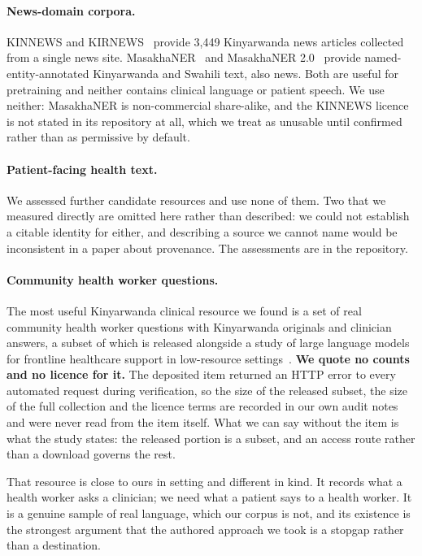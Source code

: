 \paragraph{News-domain corpora.} KINNEWS and KIRNEWS~\cite{niyongabo2020kinnews} provide 3{,}449 Kinyarwanda
news articles collected from a single news site. MasakhaNER~\cite{adelani2021masakhaner}
and MasakhaNER 2.0~\cite{adelani2022masakhaner2} provide named-entity-annotated
Kinyarwanda and Swahili text, also news. Both are useful
for pretraining and neither contains clinical language or patient speech. We use
neither: MasakhaNER is non-commercial share-alike, and the KINNEWS licence is not
stated in its repository at all, which we treat as unusable until confirmed
rather than as permissive by default.

\paragraph{Patient-facing health text.} We assessed further candidate resources
and use none of them. Two that we measured directly are omitted here rather than
described: we could not establish a citable identity for either, and describing a
source we cannot name would be inconsistent in a paper about provenance. The
assessments are in the repository.

\paragraph{Community health worker questions.} The most useful Kinyarwanda
clinical resource we found is a set of real community health worker questions with
Kinyarwanda originals and clinician answers, a subset of which is released
alongside a study of large language models for frontline healthcare support in
low-resource settings~\cite{rutunda2026llm}. \textbf{We quote no counts and no
licence for it.} The deposited item returned an HTTP error to every automated
request during verification, so the size of the released subset, the size of the
full collection and the licence terms are recorded in our own audit notes and were
never read from the item itself. What we can say without the item is what the
study states: the released portion is a subset, and an access route rather than a
download governs the rest.

That resource is close to ours in setting and different in kind. It records what
a health worker asks a clinician; we need what a patient says to a health worker.
It is a genuine sample of real language, which our corpus is not, and its
existence is the strongest argument that the authored approach we took is a
stopgap rather than a destination.


